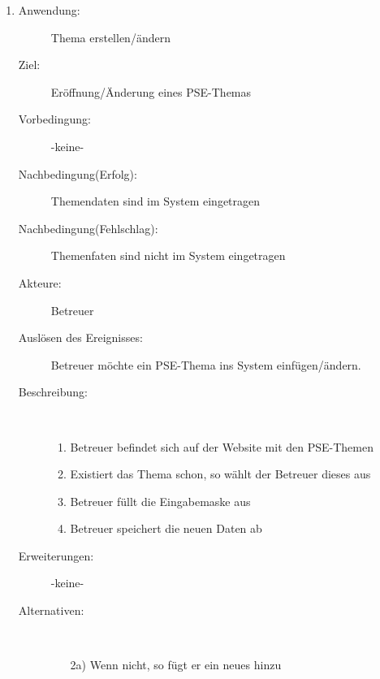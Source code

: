 \documentclass[parskip=full]{scrartcl}
\newcommand{\swtLabel}[1]{\textbf{/#1\arabic*0/}}
\begin{document}
\begin{enumerate} [label=\swtLabel{B}]
  
  \item
	\begin{description}
  		\item[Anwendung:] Thema erstellen/ändern
  		\item[Ziel:] Eröffnung/Änderung eines PSE-Themas
  		\item[Vorbedingung:] -keine-
  		\item[Nachbedingung(Erfolg):] Themendaten sind im System eingetragen
  		\item[Nachbedingung(Fehlschlag):] Themenfaten sind nicht im System
  		eingetragen
  		\item[Akteure:] Betreuer
  		\item[Auslösen des Ereignisses:] Betreuer möchte ein PSE-Thema ins System
  		einfügen/ändern.
  		\item[Beschreibung:]~
  	\begin{enumerate}
  	  \item Betreuer befindet sich auf der Website mit den PSE-Themen
  	  \item Existiert das Thema schon, so wählt der Betreuer dieses aus
  	  \item Betreuer füllt die Eingabemaske aus
  	  \item Betreuer speichert die neuen Daten ab
  	\end{enumerate}
  	\item[Erweiterungen:] -keine-
  	\item[Alternativen:]~
  	\begin{enumerate}
  	  \item[2a)] Wenn nicht, so fügt er ein neues hinzu
  	\end{enumerate}  
  \end{description}


\end{enumerate}
\end{document}
